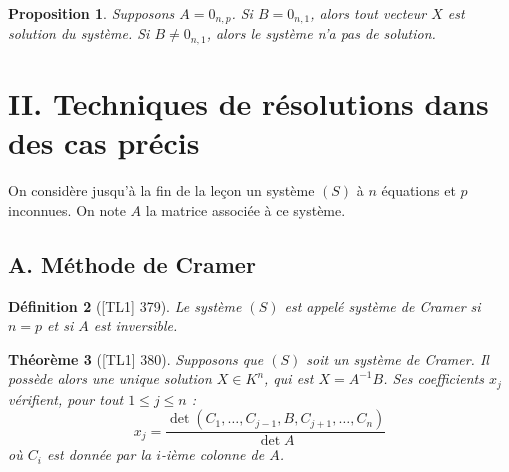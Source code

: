 \documentclass[10pt, a4paper, parskip=full, twoside, twocolumn]{report}
\newtheorem{definition}{Définition}
\newtheorem{theorem}[definition]{Théorème}
\newtheorem{proposition}[definition]{Proposition}
\begin{document}
\begin{proposition}
	Supposons $A = 0_{n,p}$. Si $B = 0_{n,1}$, alors tout vecteur $X$ est solution du système.
	Si $B\neq 0_{n,1}$, alors le système n'a pas de solution.
\end{proposition}

\section*{II. Techniques de résolutions dans des cas précis}
\textcolor{paragraphtext}{On considère jusqu'à la fin de la leçon un système $(S)$ à $n$ équations et $p$ inconnues.
On note $A$ la matrice associée à ce système.}

\subsection*{A. Méthode de Cramer}
\begin{definition}[\textnormal{[TL1] 379}]
	Le système $(S)$ est appelé \emph{système de Cramer} si $n=p$ et si $A$ est inversible.
\end{definition}

\begin{theorem}[\textnormal{[TL1] 380}]
	Supposons que $(S)$ soit un système de Cramer.
	Il possède alors une unique solution $X\in K^n$, qui est $X = A^{-1}B$.
	Ses coefficients $x_j$ vérifient, pour tout $1\leq j\leq n$ :
	$$x_j = \frac{\det(C_1,\dots, C_{j-1}, B, C_{j+1},\dots, C_n)}{\det A}$$
	où $C_i$ est donnée par la $i$-ième colonne de $A$.
\end{theorem}
\end{document}
